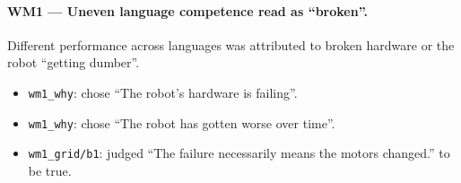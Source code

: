 \paragraph{WM1 --- Uneven language competence read as ``broken''.} Different performance across languages was attributed to broken hardware or the robot ``getting dumber''.
\begin{itemize}
\item \texttt{wm1\_why}: chose \textquotedblleft{}The robot's hardware is failing\textquotedblright{}.
\item \texttt{wm1\_why}: chose \textquotedblleft{}The robot has gotten worse over time\textquotedblright{}.
\item \texttt{wm1\_grid/b1}: judged \textquotedblleft{}The failure necessarily means the motors changed.\textquotedblright{} to be true.
\end{itemize}
